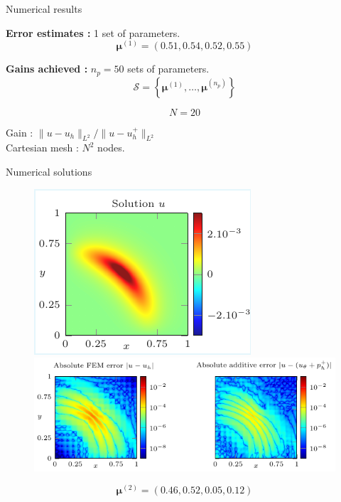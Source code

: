 \begin{frame}[noframenumbering]{Numerical results}
	\hspace{-5pt}\begin{minipage}[t]{0.46\linewidth}
		\textbf{Error estimates :} 1 set of parameters.
		$$\bm{\mu}^{(1)}=(0.51,0.54,0.52,0.55)$$
		\vspace{-35pt}
		\begin{figure}[H]
		\end{figure}
	\end{minipage} \qquad \small
	\begin{minipage}[t]{0.48\linewidth}
		\textbf{Gains achieved :} $n_p=50$ sets of parameters.
		$$\mathcal{S}=\left\{\bm{\mu}^{(1)},\dots,\bm{\mu}^{(n_p)}\right\}$$
		\vspace{-15pt}
		\begin{table}[H]
		\end{table}

		\normalsize\centering\vspace{-20pt}
		$$N=20$$

		\vspace{-5pt}
		Gain : $\| u-u_h\|_{L^2} / \| u-u_h^+\|_{L^2}$ \\
		
		\small\vspace{8pt}
		Cartesian mesh : $N^2$ nodes.
	\end{minipage}
\end{frame}

\begin{frame}{Numerical solutions}
	\begin{figure}[!ht] \centering
		\includegraphics[width=0.33\linewidth]{images/numeric/elliptic/plots/standalone_solutions_cropped.pdf}		
		\includegraphics[width=0.7\linewidth]{images/numeric/elliptic/plots/standalone_errors.pdf}
	\end{figure}

	\vspace{-8pt}
	$$\bm{\mu}^{(2)}=(0.46,0.52,0.05,0.12)$$
\end{frame}

